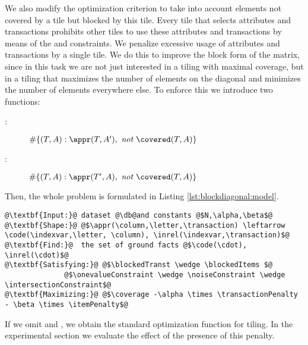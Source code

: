 We also modify the optimization criterion to take into account elements not covered by a tile but blocked by this tile. Every tile that selects attributes and transactions prohibits other tiles to use these attributes and transactions by means of the \blockedItems and \blockedTranst constraints. We penalize excessive usage of attributes and transactions by a single tile. We do this to improve the block form of the matrix, since in this task we are not just interested in a tiling with maximal coverage, but in a tiling that maximizes the number of elements on the diagonal and minimizes the number of elements everywhere else. To enforce this we introduce two functions:

\begin{description}
\item[\itemPenalty:] $\#\{ (T,A) : \appr(T,A'), ~\textit{not } \covered(T,A) \}$
\end{description}

\begin{description}
\item[\transactionPenalty:] $\#\{ (T,A) : \appr(T',A), ~\textit{not } \covered(T,A) \}$
\end{description}

Then, the whole problem is formulated in Listing \ref{lst:blockdiagonal:model}.
\begin{lstlisting}[style=model, label=lst:blockdiagonal:model, caption=ReDF Block-Diagonal Model]
@\textbf{Input:}@ dataset @\db@and constants @$N,\alpha,\beta$@
@\textbf{Shape:}@ @$\appr(\column,\letter,\transaction) \leftarrow \code(\indexvar,\letter, \column), \inrel(\indexvar,\transaction)$@
@\textbf{Find:}@  the set of ground facts @$\code(\cdot), \inrel(\cdot)$@
@\textbf{Satisfying:}@ @$\blockedTranst \wedge \blockedItems $@
              @$\onevalueConstraint \wedge \noiseConstraint \wedge \intersectionConstraint$@
@\textbf{Maximizing:}@ @$\coverage -\alpha \times \transactionPenalty - \beta \times \itemPenalty$@
\end{lstlisting}


If we omit \itemPenalty and \transactionPenalty, we obtain the standard optimization function for tiling. In the experimental section we evaluate the effect of the presence of this penalty. 



